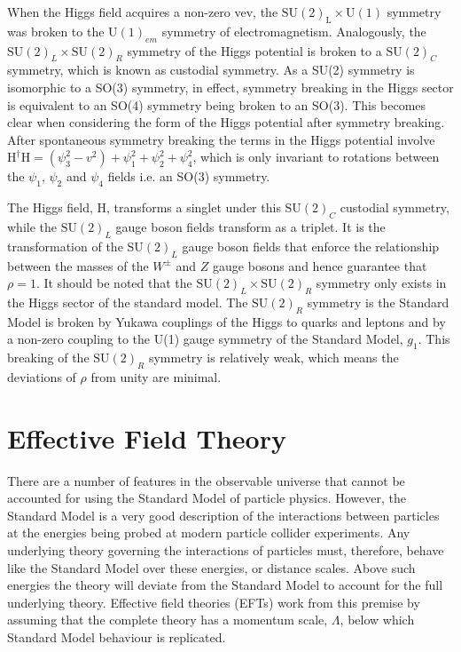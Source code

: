 When the Higgs field acquires a non-zero vev, the $\text{SU}(2)_{\text{L}} \times \text{U}(1)$ symmetry was broken to the $\text{U}(1)_{em}$ symmetry of electromagnetism.  Analogously, the $\text{SU}(2)_{L} \times \text{SU}(2)_{R}$ symmetry of the Higgs potential is broken to a $\text{SU}(2)_{C}$ symmetry, which is known as custodial symmetry.  As a SU(2) symmetry is isomorphic to a SO(3) symmetry, in effect, symmetry breaking in the Higgs sector is equivalent to an SO(4) symmetry being broken to an SO(3).  This becomes clear when considering the form of the Higgs potential after symmetry breaking.  After spontaneous symmetry breaking the terms in the Higgs potential involve $\text{H}^{\dagger}\text{H} = (\psi_{3}^{2}-v^{2}) + \psi_{1}^{2} + \psi_{2}^{2} + \psi_{4}^{2}$, which is only invariant to rotations between the $\psi_{1}$,  $\psi_{2}$ and  $\psi_{4}$ fields i.e. an SO(3) symmetry.

The Higgs field, H, transforms a singlet under this $\text{SU}(2)_{C}$ custodial symmetry, while the $\text{SU}(2)_{L}$ gauge boson fields transform as a triplet.  It is the transformation of the  $\text{SU}(2)_{L}$ gauge boson fields that enforce the relationship between the masses of the $W^{\pm}$ and $Z$ gauge bosons and hence guarantee that $\rho = 1$.  It should be noted that the $\text{SU}(2)_{L} \times \text{SU}(2)_{R}$ symmetry only exists in the Higgs sector of the standard model.  The $\text{SU}(2)_{R}$ symmetry is the Standard Model is broken by Yukawa couplings of the Higgs to quarks and leptons and by a non-zero coupling to the U(1) gauge symmetry of the Standard Model, $g_{1}$.  This breaking of the $\text{SU}(2)_{R}$ symmetry is relatively weak, which means the deviations of $\rho$ from unity are minimal.  


\section{Effective Field Theory}

There are a number of features in the observable universe that cannot be accounted for using the Standard Model of particle physics.  However, the Standard Model is a very good description of the interactions between particles at the energies being probed at modern particle collider experiments.  Any underlying theory governing the interactions of particles must, therefore, behave like the Standard Model over these energies, or distance scales.  Above such energies the theory will deviate from the Standard Model to account for the full underlying theory.  Effective field theories (EFTs) work from this premise by assuming that the complete theory  has a momentum scale, $\Lambda$, below which Standard Model behaviour is replicated.  

